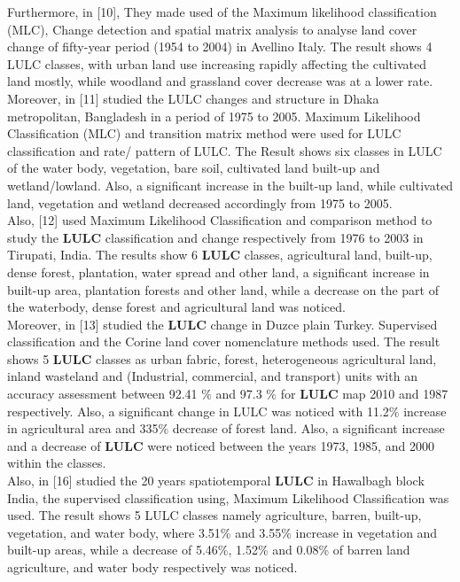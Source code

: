 \documentclass[10pt]{report}
\begin{document}
\begin{flushleft}
		Furthermore, in [10], They made used of the Maximum likelihood classification	(MLC), Change detection and spatial matrix analysis to analyse	land cover change of fifty-year period (1954 to 2004) in Avellino 	Italy. The result shows 4 LULC classes, with urban land use increasing rapidly affecting the cultivated land mostly, while woodland and grassland cover decrease was at a lower rate.	Moreover, in [11] studied the LULC changes and structure in	Dhaka metropolitan, Bangladesh in a period of 1975 to 2005.	Maximum Likelihood Classification (MLC) and transition matrix	method were used for LULC classification and rate/ pattern of	LULC. The Result shows six classes in LULC of the water body,
		vegetation, bare soil, cultivated land built-up and wetland/lowland.	Also, a significant increase in the built-up land, while cultivated	land, vegetation and wetland decreased accordingly from 1975 to	2005.\\
		
		Also,  [12] used Maximum Likelihood Classification and comparison method to study the \textbf{LULC} classification and change respectively from 1976 to 2003 in Tirupati, India. The results show 6 \textbf{LULC} classes, agricultural land, built-up, dense forest, plantation, water spread and other land, a significant increase in built-up	area, plantation forests and other land, while a decrease on the part	of the waterbody, dense forest and agricultural land was noticed.\\
		
		Moreover, in [13] studied the \textbf{LULC} change in Duzce plain Turkey. Supervised classification and the Corine land cover nomenclature methods used. The result shows 5 \textbf{LULC} classes as urban	fabric, forest, heterogeneous agricultural land, inland wasteland	and (Industrial, commercial, and transport) units with an accuracy	assessment between 92.41 $\%$ and 97.3 $\%$ for \textbf{LULC} map 2010 and	1987 respectively. Also, a significant change in LULC was noticed with 11.2$\%$ increase in agricultural area and 335$\%$ decrease	of forest land.
		Also, a significant increase and a decrease of \textbf{LULC} were noticed between the years 1973, 1985, and 2000 within the classes.\\
		
		Also, in [16] studied the 20 years spatiotemporal \textbf{LULC} in Hawalbagh block India, the supervised classification using, Maximum	Likelihood Classification was used. The result shows 5 LULC	classes namely agriculture, barren, built-up, vegetation, and water	body, where 3.51\% and 3.55\% increase in vegetation and built-up	areas, while a decrease of 5.46\%, 1.52\% and 0.08\% of barren land	agriculture, and water body respectively was noticed.\\
		

\end{flushleft}
\end{document}
